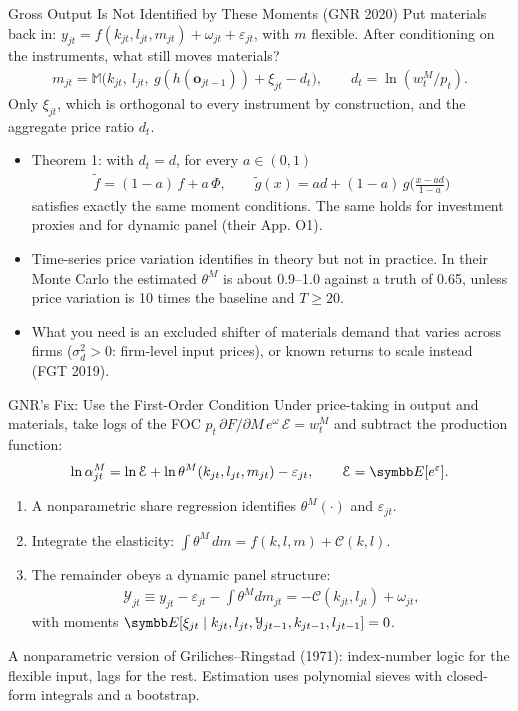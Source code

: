 \documentclass[aspectratio=169,10pt]{beamer}
\begin{document}
\begin{frame}{Gross Output Is Not Identified by These Moments (GNR 2020)}
Put materials back in: $y_{jt} = f(k_{jt}, l_{jt}, m_{jt}) + \omega_{jt} + \varepsilon_{jt}$, with $m$ flexible. After conditioning on the instruments, what still moves materials?
\begin{align*}
m_{jt} = \mathbb{M}\big(k_{jt},\ l_{jt},\ g(h(\mathbf{o}_{jt-1})) + \xi_{jt} - d_t\big), \qquad d_t = \ln(w^M_t / p_t).
\end{align*}
Only $\xi_{jt}$, which is orthogonal to every instrument by construction, and the aggregate price ratio $d_t$.
\begin{itemize}
\item \alert{Theorem 1}: with $d_t = d$, for every $a \in (0,1)$
\begin{align*}
\tilde f = (1-a)\, f + a\, \Phi, \qquad \tilde g(x) = a d + (1-a)\, g\Big(\frac{x - a d}{1 - a}\Big)
\end{align*}
satisfies exactly the same moment conditions. The same holds for investment proxies and for dynamic panel (their App. O1).
\item Time-series price variation identifies in theory but not in practice. In their Monte Carlo the estimated $\theta^M$ is about 0.9--1.0 against a truth of 0.65, unless price variation is 10 times the baseline and $T \ge 20$.
\item What you need is an \alert{excluded shifter} of materials demand that varies across firms ($\sigma^2_d > 0$: firm-level input prices), or known returns to scale instead (FGT 2019).
\end{itemize}
\end{frame}


\begin{frame}{GNR's Fix: Use the First-Order Condition}
Under price-taking in output and materials, take logs of the FOC $p_t\, \partial F/\partial M\, e^{\omega}\, \mathcal{E} = w^M_t$ and subtract the production function:
\begin{align*}
\ln \alpha^M_{jt} = \ln \mathcal{E} + \ln \theta^M(k_{jt}, l_{jt}, m_{jt}) - \varepsilon_{jt}, \qquad \mathcal{E} = \E[e^{\varepsilon}].
\end{align*}
\begin{enumerate}
\item A nonparametric \alert{share regression} identifies $\theta^M(\cdot)$ and $\varepsilon_{jt}$.
\item Integrate the elasticity: $\int \theta^M\, dm = f(k, l, m) + \mathcal{C}(k, l)$.
\item The remainder obeys a dynamic panel structure:
\begin{align*}
\mathcal{Y}_{jt} \equiv y_{jt} - \varepsilon_{jt} - \int \theta^M dm_{jt} = -\mathcal{C}(k_{jt}, l_{jt}) + \omega_{jt},
\end{align*}
with moments $\E[\xi_{jt} \mid k_{jt}, l_{jt}, \mathcal{Y}_{jt-1}, k_{jt-1}, l_{jt-1}] = 0$.
\end{enumerate}
A nonparametric version of Griliches--Ringstad (1971): index-number logic for the flexible input, lags for the rest. Estimation uses polynomial sieves with closed-form integrals and a bootstrap.
\end{frame}
\end{document}
